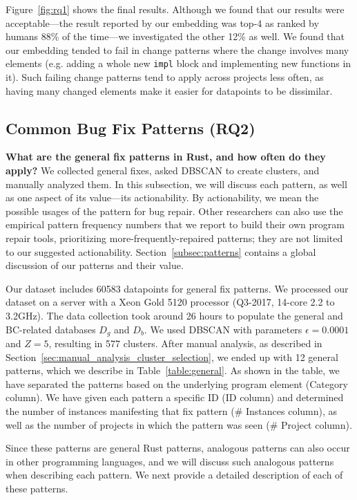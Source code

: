 Figure~\ref{fig:rq1} shows the final results. Although we found that our results were acceptable---the result reported by our embedding was top-4 as ranked by humans 88\% of the time---we investigated the other 12\% as well. We found that our embedding tended to fail in change patterns where the change involves many elements (e.g. adding a whole new \verb+impl+ block and implementing new functions in it). Such failing change patterns tend to apply across projects less often, as having many changed elements make it easier for datapoints to be dissimilar.

\subsection{\label{sec:common_patterns}Common Bug Fix Patterns (RQ2)}

\textbf{What are the general fix patterns in Rust, and how often do they apply?} 
We collected general fixes, asked DBSCAN to create clusters, and manually analyzed them. In this subsection, we will discuss each pattern, as well as one aspect of its value---its actionability. By actionability, we mean the possible usages of the pattern for bug repair. Other researchers can also use the empirical pattern frequency numbers that we report to build their own program repair tools, prioritizing more-frequently-repaired patterns; they are not limited to our suggested actionability.  Section~\ref{subsec:patterns} contains a global discussion of our patterns and their value.

Our dataset includes 60583 datapoints for general fix patterns. We processed our dataset on a server with a Xeon Gold 5120 processor (Q3-2017, 14-core 2.2 to 3.2GHz). The data collection took around 26 hours to populate the general and BC-related databases $D_g$ and $D_b$. We used DBSCAN with parameters $\epsilon=0.0001$ and $Z=5$, resulting in 577 clusters. After manual analysis, as described in Section~\ref{sec:manual_analysis_cluster_selection}, we ended up with 12 general patterns, which we describe in Table~\ref{table:general}. As shown in the table, we have separated the patterns based on the underlying program element (Category column). We have given each pattern a specific ID (ID column) and determined the number of instances manifesting that fix pattern (\# Instances column), as well as the number of projects in which the pattern was seen (\# Project column).

Since these patterns are general Rust patterns, analogous patterns can also occur in other programming languages, and we will discuss such analogous patterns when describing each pattern. We next provide a detailed description of each of these patterns.

